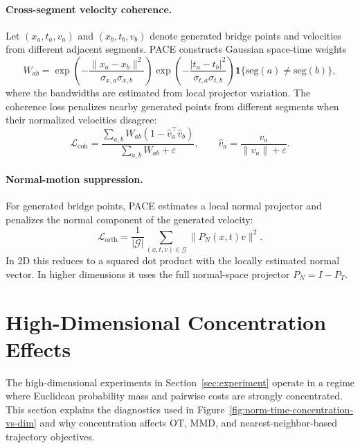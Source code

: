 \paragraph{Cross-segment velocity coherence.}
Let $(x_a,t_a,v_a)$ and $(x_b,t_b,v_b)$ denote generated bridge points and velocities from different adjacent segments. PACE constructs Gaussian space-time weights
\begin{equation}
  W_{ab}
  =
  \exp\!\left(-\frac{\|x_a-x_b\|^2}{\sigma_{x,a}\sigma_{x,b}}\right)
  \exp\!\left(-\frac{|t_a-t_b|^2}{\sigma_{t,a}\sigma_{t,b}}\right)
  \mathbf{1}\{\mathrm{seg}(a)\neq\mathrm{seg}(b)\},
\end{equation}
where the bandwidths are estimated from local projector variation. The coherence loss penalizes nearby generated points from different segments when their normalized velocities disagree:
\begin{equation}
  \mathcal{L}_{\mathrm{coh}}
  =
  \frac{\sum_{a,b}W_{ab}\left(1-\hat v_a^\top \hat v_b\right)}
  {\sum_{a,b}W_{ab}+\varepsilon},
  \qquad
  \hat v_a=\frac{v_a}{\|v_a\|+\varepsilon}.
\end{equation}

\paragraph{Normal-motion suppression.}
For generated bridge points, PACE estimates a local normal projector and penalizes the normal component of the generated velocity:
\begin{equation}
  \mathcal{L}_{\mathrm{orth}}
  =
  \frac{1}{|\mathcal{G}|}
  \sum_{(x,t,v)\in\mathcal{G}}
  \|P_N(x,t)v\|^2.
\end{equation}
In 2D this reduces to a squared dot product with the locally estimated normal vector. In higher dimensions it uses the full normal-space projector $P_N=I-P_T$.

\section{High-Dimensional Concentration Effects}
\label{sec:app:concentration}

The high-dimensional experiments in Section~\ref{sec:experiment} operate in a regime where Euclidean probability mass and pairwise costs are strongly concentrated. This section explains the diagnostics used in Figure~\ref{fig:norm-time-concentration-vs-dim} and why concentration affects OT, MMD, and nearest-neighbor-based trajectory objectives.

